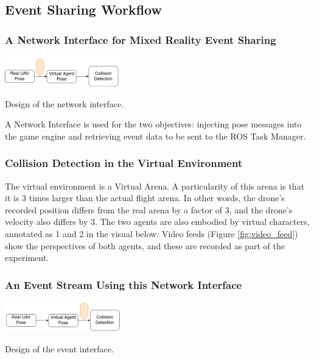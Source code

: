 \subsection{Event Sharing Workflow}
\subsubsection{A Network Interface for Mixed Reality Event Sharing}

\begin{marginfigure}%
  \includegraphics[width=5cm]{images/xr_graphs/collision_process1.png}
  \caption{Design of the network interface.}
\end{marginfigure}

A Network Interface is used for the two objectives: injecting pose messages into the game engine and retrieving event data to be sent to the ROS Task Manager.



\subsubsection{Collision Detection in the Virtual Environment}

The virtual environment is a Virtual Arena. A particularity of this arena is that it is 3 times larger than the actual flight arena. In other words, the drone's recorded position differs from the real arena by a factor of 3, and the drone's velocity also differs by 3. The two agents are also embodied by virtual characters, annotated as 1 and 2 in the visual below. Video feeds (Figure \ref{fig:video_feed}) show the perspectives of both agents, and these are recorded as part of the experiment.


\subsubsection{An Event Stream Using this Network Interface}

\begin{marginfigure}%
  \includegraphics[width=5cm]{images/xr_graphs/collision_process2.png}
  \caption{Design of the event interface.}
\end{marginfigure}

